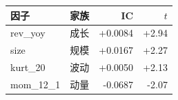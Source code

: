 \begin{tabular}{@{}llrr@{}}
\toprule
因子 & 家族 & IC & $t$ \\
\midrule
rev\_yoy & 成长 & +0.0084 & +2.94 \\
size & 规模 & +0.0167 & +2.27 \\
kurt\_20 & 波动 & +0.0050 & +2.13 \\
mom\_12\_1 & 动量 & -0.0687 & -2.07 \\
\bottomrule
\end{tabular}

